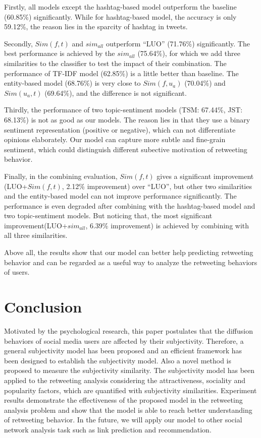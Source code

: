 \documentclass[letterpaper]{article}
\begin{document}
Firstly, all models except the hashtag-based model outperform the baseline (60.85\%) significantly. While for hashtag-based model, the accuracy is only 59.12\%, the reason lies in the sparcity of hashtag in tweets. 

Secondly, $ Sim(f,t) $ and $ sim_{all}  $ outperform ``LUO'' (71.76\%) significantly.
The best performance is achieved by the $ sim_{all}  $ (75.64\%), for which we add three similarities to the classifier to test the impact of their combination. 
The performance of TF-IDF model (62.85\%) is a little better than baseline. 
The entity-based model (68.76\%) is very close to  $ Sim(f,u_a)$ (70.04\%) and $ Sim(u_a,t)  $ (69.64\%), and the difference is not significant.

Thirdly, the performance of two topic-sentiment models (TSM: 67.44\%, JST: 68.13\%) is not as good as our models. The reason lies in that they use a binary sentiment representation (positive or negative), which can not differentiate opinions elaborately. Our model can capture more subtle and fine-grain sentiment, which could distinguish different subective motivation of retweeting behavior.

Finally, in the combining evaluation, $ Sim(f,t) $ gives a significant improvement (LUO+$ Sim(f,t) $, 2.12\% improvement) over ``LUO'', but other two similarities and the entity-based model can not improve performance significantly. The performance is even degraded after combining with the hashtag-based model and two topic-sentiment models. 
But noticing that, the most significant improvement(LUO+$ sim_{all}  $, 6.39\% improvement) is achieved by combining with all three similarities. 

Above all, the results show that our model can better help predicting retweeting behavior and can be regarded as a useful way to analyze the retweeting behaviors of users. 

\section{Conclusion}
Motivated by the psychological research, this paper postulates that the diffusion behaviors of social media users are affected by their subjectivity. Therefore, a general subjectivity model has been proposed and an efficient framework has been designed to establish the subjectivity model. Also a novel method is proposed to measure the subjectivity similarity. The subjectivity model has been applied to the retweeting analysis considering the attractiveness, sociality and popularity factors, which are quantified with subjectivity similarities. 
Experiment results demonstrate the effectiveness of the proposed model in the retweeting analysis problem and show that the model is able to reach better understanding of retweeting behavior. 
In the future, we will apply our model to other social network analysis task such as link prediction and recommendation. 



\end{document}
